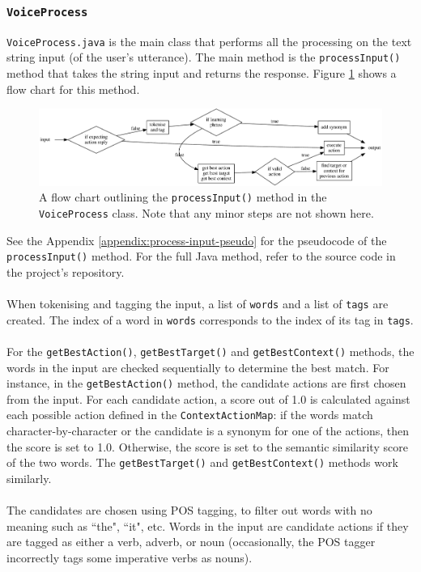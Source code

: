 \documentclass[11pt]{article}
\begin{document}
\subsubsection{\texttt{VoiceProcess}}

\texttt{VoiceProcess.java} is the main class that performs all the processing on the text string input (of the user's utterance). The main method is the \texttt{processInput()} method that takes the string input and returns the response. Figure \ref{fig:process-input} shows a flow chart for this method.

\begin{figure}[H]
\begin{center}
  \includegraphics[width=\linewidth]{process-input.pdf}
  \caption{A flow chart outlining the \texttt{processInput()} method in the \texttt{VoiceProcess} class. Note that any minor steps are not shown here.}
  \label{fig:process-input}
  \end{center}
\end{figure}

See the Appendix \ref{appendix:process-input-pseudo} for the pseudocode of the \texttt{processInput()} method. For the full Java method, refer to the source code in the project's repository.
\\
\\
When tokenising and tagging the input, a list of \texttt{words} and a list of \texttt{tags} are created. The index of a word in \texttt{words} corresponds to the index of its tag in \texttt{tags}.
\\
\\
For the \texttt{getBestAction()}, \texttt{getBestTarget()} and  \texttt{getBestContext()} methods, the words in the input are checked sequentially to determine the best match. For instance, in the \texttt{getBestAction()} method, the candidate actions are first chosen from the input. For each candidate action, a score out of 1.0 is calculated against each possible action defined in the \texttt{ContextActionMap}: if the words match character-by-character or the candidate is a synonym for one of the actions, then the score is set to 1.0. Otherwise, the score is set to the semantic similarity score of the two words. The \texttt{getBestTarget()} and \texttt{getBestContext()} methods work similarly.
\\
\\
The candidates are chosen using POS tagging, to filter out words with no meaning such as ``the", ``it", etc. Words in the input are candidate actions if they are tagged as either a verb, adverb, or noun (occasionally, the POS tagger incorrectly tags some imperative verbs as nouns).
\end{document}

